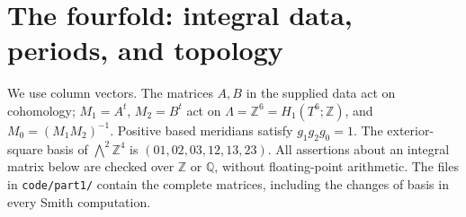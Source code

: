 \section{The fourfold: integral data, periods, and topology}
\label{sec:fourfold}

We use column vectors.  The matrices $A,B$ in the supplied data act on
cohomology; $M_1=A^t$, $M_2=B^t$ act on
$\Lambda=\mathbb Z^6=H_1(T^6;\mathbb Z)$, and
$M_0=(M_1M_2)^{-1}$.  Positive based meridians satisfy
$g_1g_2g_0=1$.  The exterior-square basis of $\bigwedge^2\mathbb Z^4$
is $(01,02,03,12,13,23)$.  All assertions about an integral matrix below
are checked over $\mathbb Z$ or $\mathbb Q$, without floating-point
arithmetic.  The files in \texttt{code/part1/} contain the complete
matrices, including the changes of basis in every Smith computation.

